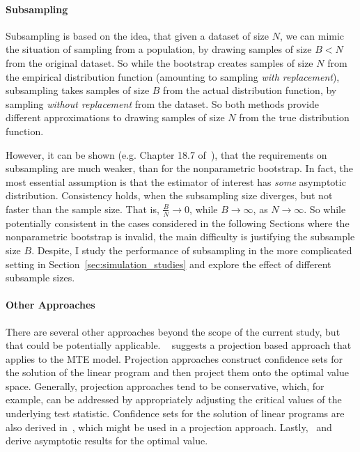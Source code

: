 \documentclass[12pt,a4paper,english]{article} %
\numberwithin{equation}{section}
\theoremstyle{definition}
\theoremstyle{remark}
\theoremstyle{plain}
\begin{document}
\paragraph{Subsampling}
Subsampling is based on the idea, that given a dataset of size $N$, we can mimic the situation of sampling from a population, by drawing samples of size $B<N$ from the original dataset.
So while the bootstrap creates samples of size $N$ from the empirical distribution function (amounting to sampling \textit{with replacement}), subsampling takes samples of size $B$ from the actual distribution function, by sampling \textit{without replacement} from the dataset.
So both methods provide different approximations to drawing samples of size $N$ from the true distribution function.

However, it can be shown (e.g. Chapter 18.7 of~\cite{lehmann_romano2022}), that the requirements on subsampling are much weaker, than for the nonparametric bootstrap.
In fact, the most essential assumption is that the estimator of interest has \textit{some} asymptotic distribution.
Consistency holds, when the subsampling size diverges, but not faster than the sample size. That is, $\frac{B}{N}\to 0$, while $B\to \infty$, as $N\to\infty$.
So while potentially consistent in the cases considered in the following Sections where the nonparametric bootstrap is invalid, the main difficulty is justifying the subsample size $B$.
Despite, I study the performance of subsampling in the more complicated setting in Section~\ref{sec:simulation_studies} and explore the effect of different subsample sizes.

\paragraph{Other Approaches}
There are several other approaches beyond the scope of the current study, but that could be potentially applicable.
~\cite{bei2023inference} suggests a projection based approach that applies to the MTE model.
Projection approaches construct confidence sets for the solution of the linear program and then project them onto the optimal value space.
Generally, projection approaches tend to be conservative, which, for example, can be addressed by appropriately adjusting the critical values of the underlying test statistic.
Confidence sets for the solution of linear programs are also derived in~\cite{hsieh2022inference}, which might be used in a projection approach.
Lastly,~\cite{freyberger2015identification} and~\cite{bhattacharya2009inferring} derive asymptotic results for the optimal value.
\end{document}
